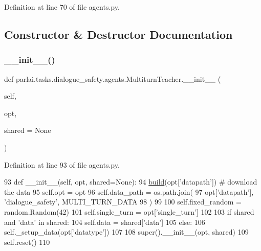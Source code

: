 Definition at line 70 of file agents.\+py.



\subsection{Constructor \& Destructor Documentation}
\mbox{\label{classparlai_1_1tasks_1_1dialogue__safety_1_1agents_1_1MultiturnTeacher_a8fa5d01f2e3d9a9829d0970a5ae4cfba}} 
\subsubsection{\texorpdfstring{\+\_\+\+\_\+init\+\_\+\+\_\+()}{\_\_init\_\_()}}
{\footnotesize\ttfamily def parlai.\+tasks.\+dialogue\+\_\+safety.\+agents.\+Multiturn\+Teacher.\+\_\+\+\_\+init\+\_\+\+\_\+ (\begin{DoxyParamCaption}\item[{}]{self,  }\item[{}]{opt,  }\item[{}]{shared = {\ttfamily None} }\end{DoxyParamCaption})}



Definition at line 93 of file agents.\+py.


\begin{DoxyCode}
93     \textcolor{keyword}{def }\_\_init\_\_(self, opt, shared=None):
94         \hyperlink{namespaceparlai_1_1mturk_1_1tasks_1_1talkthewalk_1_1download_a8c0fbb9b6dfe127cb8c1bd6e7c4e33fd}{build}(opt[\textcolor{stringliteral}{'datapath'}])  \textcolor{comment}{# download the data}
95         self.opt = opt
96         self.data\_path = os.path.join(
97             opt[\textcolor{stringliteral}{'datapath'}], \textcolor{stringliteral}{'dialogue\_safety'}, MULTI\_TURN\_DATA
98         )
99 
100         self.fixed\_random = random.Random(42)
101         self.single\_turn = opt[\textcolor{stringliteral}{'single\_turn'}]
102 
103         \textcolor{keywordflow}{if} shared \textcolor{keywordflow}{and} \textcolor{stringliteral}{'data'} \textcolor{keywordflow}{in} shared:
104             self.data = shared[\textcolor{stringliteral}{'data'}]
105         \textcolor{keywordflow}{else}:
106             self.\_setup\_data(opt[\textcolor{stringliteral}{'datatype'}])
107 
108         super().\_\_init\_\_(opt, shared)
109         self.reset()
110 
\end{DoxyCode}


